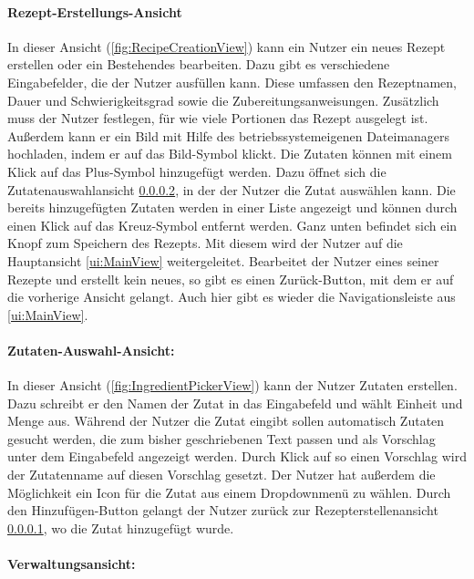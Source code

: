 \documentclass[parskip=full]{scrartcl}
\begin{document}
\paragraph{Rezept-Erstellungs-Ansicht}
\label{ui:RecipeCreationView}
In dieser Ansicht (\autoref{fig:RecipeCreationView}) kann ein Nutzer ein neues Rezept erstellen oder ein Bestehendes bearbeiten. Dazu gibt es verschiedene Eingabefelder, die der Nutzer ausfüllen kann. Diese umfassen den Rezeptnamen, Dauer und Schwierigkeitsgrad sowie die Zubereitungsanweisungen. Zusätzlich muss der Nutzer festlegen, für wie viele Portionen das Rezept ausgelegt ist. Außerdem kann er ein Bild mit Hilfe des betriebssystemeigenen Dateimanagers hochladen, indem er auf das Bild-Symbol klickt.
Die Zutaten können mit einem Klick auf das Plus-Symbol hinzugefügt werden. Dazu öffnet sich die Zutatenauswahlansicht \ref{ui:IngredientPickerView}, in der der Nutzer die Zutat auswählen kann. Die bereits hinzugefügten Zutaten werden in einer Liste angezeigt und können durch einen Klick auf das Kreuz-Symbol entfernt werden. Ganz unten befindet sich ein Knopf zum Speichern des Rezepts. Mit diesem wird der Nutzer auf die Hauptansicht \ref{ui:MainView} weitergeleitet. Bearbeitet der Nutzer eines seiner Rezepte und erstellt kein neues, so gibt es einen Zurück-Button, mit dem er auf die vorherige Ansicht gelangt. Auch hier gibt es wieder die Navigationsleiste aus \ref{ui:MainView}.

\paragraph{Zutaten-Auswahl-Ansicht:}
\label{ui:IngredientPickerView}
In dieser Ansicht (\autoref{fig:IngredientPickerView}) kann der Nutzer Zutaten erstellen. Dazu schreibt er den Namen der Zutat in das Eingabefeld und wählt Einheit und Menge aus. Während der Nutzer die Zutat eingibt sollen automatisch Zutaten gesucht werden, die zum bisher geschriebenen Text passen und als Vorschlag unter dem Eingabefeld angezeigt werden. Durch Klick auf so einen Vorschlag wird der Zutatenname auf diesen Vorschlag gesetzt. Der Nutzer hat außerdem die Möglichkeit ein Icon für die Zutat aus einem Dropdownmenü zu wählen. Durch den Hinzufügen-Button gelangt der Nutzer zurück zur Rezepterstellenansicht \ref{ui:RecipeCreationView}, wo die Zutat hinzugefügt wurde.

\paragraph{Verwaltungsansicht:}
\label{ui:SettingsView}
\end{document}
